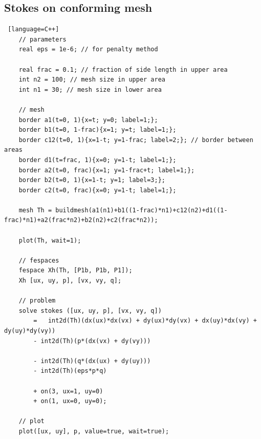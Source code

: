 \documentclass{article}
\begin{document}
\subsection*{Stokes on conforming mesh}
\begin{lstlisting} [language=C++]
	// parameters
	real eps = 1e-6; // for penalty method 

	real frac = 0.1; // fraction of side length in upper area
	int n2 = 100; // mesh size in upper area
	int n1 = 30; // mesh size in lower area

	// mesh
	border a1(t=0, 1){x=t; y=0; label=1;};
	border b1(t=0, 1-frac){x=1; y=t; label=1;};
	border c12(t=0, 1){x=1-t; y=1-frac; label=2;}; // border between areas
	border d1(t=frac, 1){x=0; y=1-t; label=1;};
	border a2(t=0, frac){x=1; y=1-frac+t; label=1;};
	border b2(t=0, 1){x=1-t; y=1; label=3;};
	border c2(t=0, frac){x=0; y=1-t; label=1;};

	mesh Th = buildmesh(a1(n1)+b1((1-frac)*n1)+c12(n2)+d1((1-frac)*n1)+a2(frac*n2)+b2(n2)+c2(frac*n2));

	plot(Th, wait=1);

	// fespaces
	fespace Xh(Th, [P1b, P1b, P1]);
	Xh [ux, uy, p], [vx, vy, q];
 	 
	// problem
	solve stokes ([ux, uy, p], [vx, vy, q])
		=   int2d(Th)(dx(ux)*dx(vx) + dy(ux)*dy(vx) + dx(uy)*dx(vy) + dy(uy)*dy(vy))
        - int2d(Th)(p*(dx(vx) + dy(vy)))

        - int2d(Th)(q*(dx(ux) + dy(uy)))
        - int2d(Th)(eps*p*q)

        + on(3, ux=1, uy=0)
      	+ on(1, ux=0, uy=0);

	// plot
	plot([ux, uy], p, value=true, wait=true);
\end{lstlisting}
\end{document}
